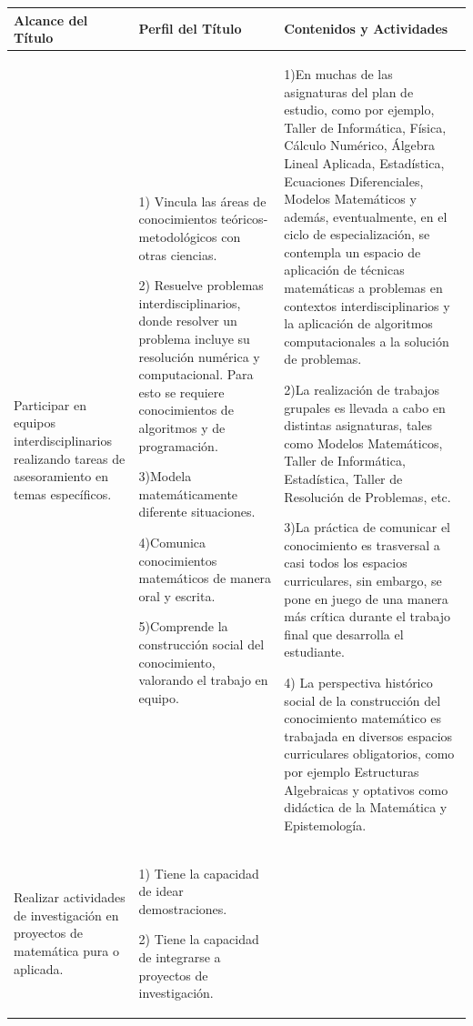 \documentclass[a4paper, 12pt]{article}
\begin{document}
\begin{center}


\begin{longtable}{|p{}|p{}|p{}|}\hline
  \rowcolor[gray]{.9}
  Alcance del Título
  & Perfil del Título
  & Contenidos y Actividades \\ \hline
  Participar en equipos interdisciplinarios realizando tareas de asesoramiento en temas específicos.
  &1) Vincula las áreas de conocimientos teóricos-metodológicos con otras ciencias.

  2) Resuelve problemas interdisciplinarios, donde resolver un problema incluye su resolución numérica y computacional. Para esto se requiere conocimientos de algoritmos y de programación.

  3)Modela matemáticamente diferente situaciones.

  4)Comunica conocimientos matemáticos de manera oral y escrita.

  5)Comprende la construcción social del conocimiento, valorando el trabajo en equipo.
  &1)En muchas de las asignaturas del plan de estudio, como por ejemplo, Taller de Informática, Física, Cálculo Numérico, Álgebra Lineal Aplicada, Estadística, Ecuaciones Diferenciales, Modelos Matemáticos y además, eventualmente, en el ciclo de especialización, se contempla un espacio de aplicación de técnicas matemáticas a problemas en contextos interdisciplinarios y la aplicación de algoritmos computacionales a la solución de problemas.

  2)La realización de trabajos grupales es llevada a cabo en distintas asignaturas, tales como   Modelos Matemáticos, Taller de Informática, Estadística, Taller de Resolución de Problemas, etc.

  3)La práctica de comunicar el conocimiento es trasversal a casi todos los espacios curriculares, sin embargo, se pone en juego de una manera más crítica durante el trabajo final que desarrolla el estudiante.

  4) La perspectiva histórico social de la construcción del conocimiento matemático es trabajada en diversos espacios curriculares obligatorios, como por ejemplo Estructuras Algebraicas y optativos como didáctica de la Matemática y Epistemología. \\ \hline

  Realizar actividades de investigación en proyectos de matemática pura o aplicada.
  & 1) Tiene la capacidad de idear demostraciones.

  2) Tiene la capacidad de integrarse a proyectos de investigación.


\end{longtable}
\end{center}
\end{document}

